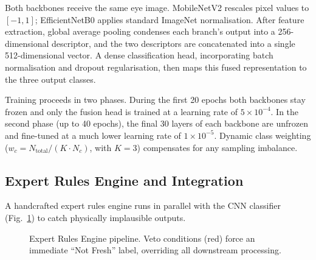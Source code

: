 \documentclass[conference]{IEEEtran}
\begin{document}
Both backbones receive the same eye image. MobileNetV2 rescales pixel values to $[-1, 1]$; EfficientNetB0 applies standard ImageNet normalisation. After feature extraction, global average pooling condenses each branch's output into a 256-dimensional descriptor, and the two descriptors are concatenated into a single 512-dimensional vector. A dense classification head, incorporating batch normalisation and dropout regularisation, then maps this fused representation to the three output classes.

Training proceeds in two phases. During the first 20 epochs both backbones stay frozen and only the fusion head is trained at a learning rate of $5 \times 10^{-4}$. In the second phase (up to 40 epochs), the final 30 layers of each backbone are unfrozen and fine-tuned at a much lower learning rate of $1 \times 10^{-5}$. Dynamic class weighting ($w_c = N_{\text{total}} / (K \cdot N_c)$, with $K = 3$) compensates for any sampling imbalance.

\subsection{Expert Rules Engine and Integration}
A handcrafted expert rules engine runs in parallel with the CNN classifier (Fig.~\ref{fig:expert_pipeline}) to catch physically implausible outputs.

\begin{figure}[h]
\centering
{}
\caption{Expert Rules Engine pipeline. Veto conditions (red) force an immediate ``Not Fresh'' label, overriding all downstream processing.}
\label{fig:expert_pipeline}
\end{figure}
\end{document}
